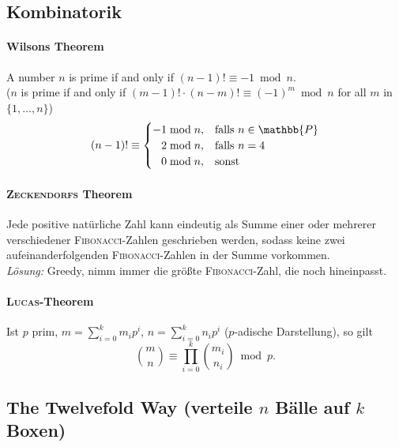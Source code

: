 \subsection{Kombinatorik}

\paragraph{Wilsons Theorem}
A number $n$ is prime if and only if 
$(n-1)!\equiv -1\bmod{n}$.\\
($n$ is prime if and only if $(m-1)!\cdot(n-m)!\equiv(-1)^m\bmod{n}$ for all $m$ in $\{1,\dots,n\}$)
\begin{align*}
	(n-1)!\equiv\begin{cases}
		-1\bmod{n},&\mathrm{falls}~n \in \mathbb{P}\\
		\hphantom{-}2\bmod{n},&\mathrm{falls}~n = 4\\
		\hphantom{-}0\bmod{n},&\mathrm{sonst}
	\end{cases}
\end{align*}

\paragraph{\textsc{Zeckendorfs} Theorem}
Jede positive natürliche Zahl kann eindeutig als Summe einer oder mehrerer
verschiedener \textsc{Fibonacci}-Zahlen geschrieben werden, sodass keine zwei
aufeinanderfolgenden \textsc{Fibonacci}-Zahlen in der Summe vorkommen.\\
\emph{Lösung:} Greedy, nimm immer die größte \textsc{Fibonacci}-Zahl, die noch
hineinpasst.

\paragraph{\textsc{Lucas}-Theorem}
Ist $p$ prim, $m=\sum_{i=0}^km_ip^i$, $n=\sum_{i=0}^kn_ip^i$ ($p$-adische Darstellung),
so gilt
\vspace{-0.75\baselineskip}
\[
	\binom{m}{n} \equiv \prod_{i=0}^k\binom{m_i}{n_i} \bmod{p}.
\]

\subsection{The Twelvefold Way \textnormal{(verteile $n$ Bälle auf $k$ Boxen)}}


